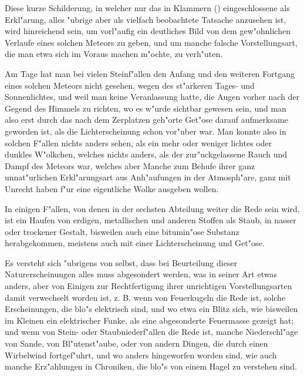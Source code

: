 \documentclass[a4paper, 11pt, oneside, polutonikogreek, german]{article}
\begin{document}
Diese kurze Schilderung, in welcher nur das in Klammern () eingeschlossene als Erkl"arung, alles "ubrige aber als vielfach beobachtete Tatsache anzusehen ist, wird hinreichend sein, um vorl"aufig ein deutliches Bild von dem gew"ohnlichen Verlaufe eines solchen Meteors zu geben, und um manche falsche Vorstellungsart, die man etwa sich im Voraus machen m"ochte, zu verh"uten.

Am Tage hat man bei vielen Steinf"allen den Anfang und den weiteren Fortgang eines solchen Meteors nicht gesehen, wegen des st"arkeren Tages- und Sonnenlichtes, und weil man keine Veranlassung hatte, die Augen vorher nach der Gegend des Himmels zu richten, wo es w"urde sichtbar gewesen sein, und man also erst durch das nach dem Zerplatzen geh"orte Get"ose darauf aufmerksame geworden ist, als die Lichterscheinung schon vor"uber war. Man konnte also in solchen F"allen nichts anders sehen, als ein mehr oder weniger lichtes oder dunkles W"olkchen, welches nichts anders, als der zur"uckgelassene Rauch und Dampf des Meteors war, welches aber Manche zum Behufe ihrer ganz unnat"urlichen Erkl"arungsart aus Anh"aufungen in der Atmosph"are, ganz mit Unrecht haben f"ur eine eigentliche Wolke ausgeben wollen.

In einigen F"allen, von denen in der sechsten Abteilung weiter die Rede sein wird, ist ein Haufen von erdigen, metallischen und anderen Stoffen als Staub, in nasser oder trockener Gestalt, bisweilen auch eine bitumin"ose Substanz herabgekommen, meistens auch mit einer Lichterscheinung und Get"ose.

Es versteht sich "ubrigens von selbst, dass bei Beurteilung dieser Naturerscheinungen alles muss abgesondert werden, was in seiner Art etwas anders, aber von Einigen zur Rechtfertigung ihrer unrichtigen Vorstellungsarten damit verwechselt worden ist, z. B. wenn von Feuerkugeln die Rede ist, solche Erscheinungen, die blo"s elektrisch sind, und wo etwa ein Blitz sich, wie bisweilen im Kleinen ein elektrischer Funke, als eine abgesonderte Feuermasse gezeigt hat; und wenn von Stein- oder Staubniederf"allen die Rede ist, manche Niederschl"age von Sande, von Bl"utenst"aube, oder von andern Dingen, die durch einen Wirbelwind fortgef"uhrt, und wo anders hingeworfen worden sind, wie auch manche Erz"ahlungen in Chroniken, die blo"s von einem Hagel zu verstehen sind.
\subsection{}
\end{document}
